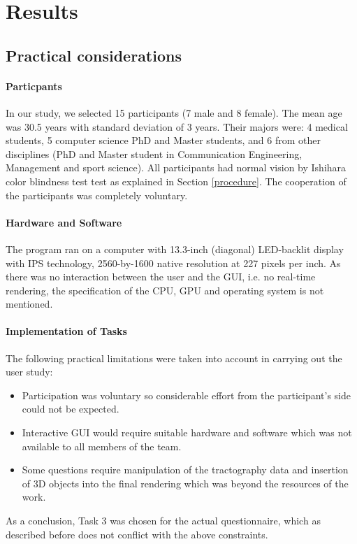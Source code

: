 \documentclass[hyperref, plainreport, noproblem]{cgvpub1}
\begin{document}
\section{Results}
\subsection{Practical considerations }
\paragraph{Particpants} In our study, we selected 15 participants (7 male and 8 female). The  mean age was 30.5 years with standard deviation of 3 years. Their majors were: 4 medical students, 5 computer science PhD and Master students, and 6 from other disciplines (PhD and Master student in Communication Engineering, Management and sport science). All participants had normal vision by Ishihara color blindness test test as explained in Section \ref{procedure}. The cooperation of the participants was completely voluntary.

\paragraph{Hardware and Software} The program ran on a computer with 13.3-inch (diagonal) LED-backlit display with IPS technology, 2560-by-1600 native resolution at 227 pixels per inch. As there was no interaction between the user and the GUI, i.e. no real-time rendering, the specification of the CPU, GPU and operating system is not mentioned. 



\paragraph{Implementation of Tasks} The following practical limitations were taken into account in carrying out the user study:
\begin{itemize}
	\item Participation was voluntary so considerable effort from the participant's side could not be expected.
	\item Interactive GUI would require suitable hardware and software which was not available to all members of the team.
	\item Some questions require manipulation of the tractography data and insertion of 3D objects into the final rendering which was beyond the resources of the work.
\end{itemize}
As a conclusion, Task 3 was chosen for the actual questionnaire, which as described before does not conflict with the above constraints.
\end{document}
